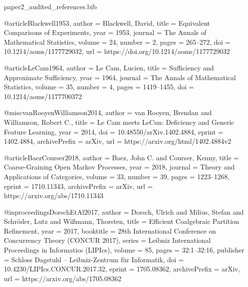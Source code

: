 \begin{filecontents*}[overwrite]{paper2_audited_references.bib}

@article{Blackwell1953,
  author = {Blackwell, David},
  title = {Equivalent Comparisons of Experiments},
  year = {1953},
  journal = {The Annals of Mathematical Statistics},
  volume = {24},
  number = {2},
  pages = {265--272},
  doi = {10.1214/aoms/1177729032},
  url = {https://doi.org/10.1214/aoms/1177729032}
}

@article{LeCam1964,
  author = {Le Cam, Lucien},
  title = {Sufficiency and Approximate Sufficiency},
  year = {1964},
  journal = {The Annals of Mathematical Statistics},
  volume = {35},
  number = {4},
  pages = {1419--1455},
  doi = {10.1214/aoms/1177700372}
}

@misc{vanRooyenWilliamson2014,
  author = {van Rooyen, Brendan and Williamson, Robert C.},
  title = {{Le Cam} meets {LeCun}: Deficiency and Generic Feature Learning},
  year = {2014},
  doi = {10.48550/arXiv.1402.4884},
  eprint = {1402.4884},
  archivePrefix = {arXiv},
  url = {https://arxiv.org/html/1402.4884v2}
}

@article{BaezCourser2018,
  author = {Baez, John C. and Courser, Kenny},
  title = {Coarse-Graining Open Markov Processes},
  year = {2018},
  journal = {Theory and Applications of Categories},
  volume = {33},
  number = {39},
  pages = {1223--1268},
  eprint = {1710.11343},
  archivePrefix = {arXiv},
  url = {https://arxiv.org/abs/1710.11343}
}

@inproceedings{DorschEtAl2017,
  author = {Dorsch, Ulrich and Milius, Stefan and Schr{\"o}der, Lutz and Wi{\ss}mann, Thorsten},
  title = {Efficient Coalgebraic Partition Refinement},
  year = {2017},
  booktitle = {28th International Conference on Concurrency Theory (CONCUR 2017)},
  series = {Leibniz International Proceedings in Informatics (LIPIcs)},
  volume = {85},
  pages = {32:1--32:16},
  publisher = {Schloss Dagstuhl -- Leibniz-Zentrum f{\"u}r Informatik},
  doi = {10.4230/LIPIcs.CONCUR.2017.32},
  eprint = {1705.08362},
  archivePrefix = {arXiv},
  url = {https://arxiv.org/abs/1705.08362}
}


\end{filecontents*}
